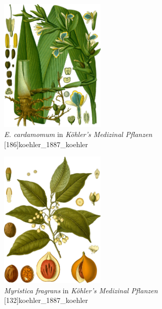 \documentclass[12pt]{article}
\begin{document}
\begin{figure}[!ht]
    \centering
    \includegraphics[width=0.45\textwidth]{imgs/cardamom.png}
    \caption{\textit{E. cardamomum} in \textit{Köhler's Medizinal Pflanzen} [186]{koehler_1887_koehler}}
    \label{fig:plant}
\end{figure}




\begin{figure}[!ht]
    \centering
    \includegraphics[width=0.45\textwidth]{imgs/nutmeg.png}
    \caption{\textit{Myristica fragrans} in \textit{Köhler's Medizinal Pflanzen} [132]{koehler_1887_koehler}}
    \label{fig:plant}
\end{figure}
\end{document}
